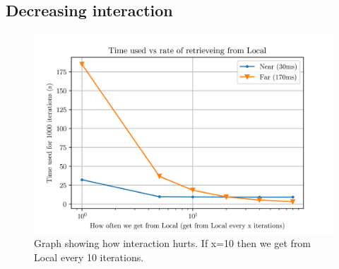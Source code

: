 \subsection{Decreasing interaction}

\begin{figure}[t]
    \centering
    \includegraphics[scale=1]{chapters/evaluation/figures/times.png}
    \caption{Graph showing how interaction hurts. If x=10 then we get from Local every 10 iterations.}
    \label{fig:time_graph_near_far}
\end{figure}

